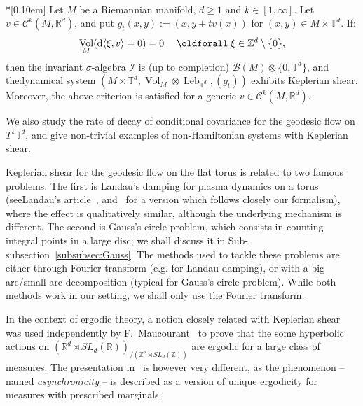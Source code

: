 \documentclass[AHL,Unicode,longabstracts]{cedram}
\DeclareMathOperator{\Leb}{Leb}
\DeclareMathOperator{\Vol}{Vol}
\newcommand{\Z}{\mathbb{Z}}
\newcommand{\R}{\mathbb{R}}
\newcommand{\Tbb}{\mathbb{T}}
\newcommand{\Bcal}{\mathcal{B}}
\newcommand{\Ccal}{\mathcal{C}}
\newcommand{\Ical}{\mathcal{I}}
\newcommand{\de}{{\rm d}}
\renewcommand*{\forall}{\mathrel{\oldforall}}
\begin{document}
\begin{prop}\ \\*[0.10em]
Let $M$ be a Riemannian manifold, $d \geq 1$ and $k \in [1, \infty]$. Let $v \in \Ccal^k (M, \R^d)$, and put $g_t (x,y) := (x, y+tv(x))$ for $(x,y)\in M \times \Tbb^d$. If:
\[
\Vol_M (\de \langle \xi, v \rangle = 0) = 0 \quad \forall \xi \in \Z^d \setminus \{0\},
\]
then the invariant $\sigma$-algebra $\Ical$ is (up to completion) $\Bcal (M) \otimes \{0, \Tbb^d\}$, and the\linebreak dynamical system $(M \times \Tbb^d, \Vol_M \otimes \Leb_{\Tbb^d}, (g_t))$ exhibits Keplerian shear. Moreover, the above criterion is satisfied for a generic $v \in \Ccal^k (M, \R^d)$.
\end{prop}

We also study the rate of decay of conditional covariance for the geodesic flow on $T^1 \Tbb^d$, and give non-trivial examples of non-Hamiltonian systems with Keplerian shear.


Keplerian shear for the geodesic flow on the flat torus is related to two famous problems. The first is Landau's damping for plasma dynamics on a torus (see\linebreak Landau's article~\cite{Landau:1946}, and~\cite[Theorem~3.1]{MouhotVillani:2011} for a version which follows closely our formalism), where the effect is qualitatively similar, although the underlying mechanism is different. The second is Gauss's circle problem, which consists in counting integral points in a large disc; we shall discuss it in Sub-subsection~\ref{subsubsec:Gauss}. The methods used to tackle these problems are either through Fourier transform (e.g. for Landau damping), or with a big arc/small arc decomposition (typical for Gauss's circle problem). While both methods work in our setting, we shall only use the Fourier transform.


In the context of ergodic theory, a notion closely related with Keplerian shear was used independently by F.~Maucourant~\cite{Maucourant:2016} to prove that the some hyperbolic actions on $(\R^d \rtimes SL_d (\R))_{/(\Z^d \rtimes SL_d (\Z))}$ are ergodic for a large class of measures. The presentation in~\cite{Maucourant:2016} is however very different, as the phenomenon -- named \emph{asynchronicity} -- is described as a version of unique ergodicity for measures with prescribed marginals.
\end{document}
